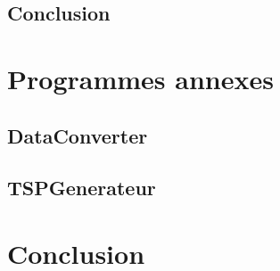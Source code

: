 \documentclass[10pt,a4paper]{report}
\begin{document}
	\subsection{Conclusion}

\section{Programmes annexes}

	\subsection{DataConverter}
	
	\subsection{TSPGenerateur}
	
\section{Conclusion}
	
\end{document}
